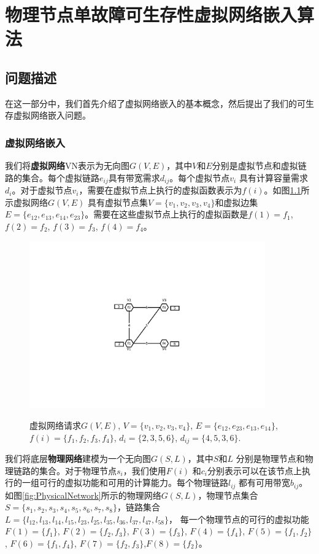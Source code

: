 \chapter{物理节点单故障可生存性虚拟网络嵌入算法}
\section{问题描述}
在这一部分中，我们首先介绍了虚拟网络嵌入的基本概念，然后提出了我们的可生存虚拟网络嵌入问题。
\subsection{虚拟网络嵌入}
我们将\textbf{虚拟网络}VN表示为无向图$G (V,E)$，其中$V$和$E$分别是虚拟节点和虚拟链路的集合。每个虚拟链路$e_{ij}$具有带宽需求$d_{ij}$。每个虚拟节点$v_i$ 具有计算容量需求$d_i$。对于虚拟节点$v_i$，需要在虚拟节点上执行的虚拟函数表示为$f(i)$。如图\ref{fig:VirtualNetworkRequest}所示虚拟网络$G (V,E)$ 具有虚拟节点集$V=\{v_1,v_2,v_3,v_4\}$和虚拟边集$E= \{e_{12},e_{13},e_{14},e_{23}\}$。需要在这些虚拟节点上执行的虚拟函数是$f(1)=f_1$, $f(2)=f_2$, $f(3)=f_3$, $f(4)=f_4$。

\begin{figure}
\centering
\includegraphics[width=4in]{figures/VirtualNetworkRequest}\\
\caption{虚拟网络请求$G(V,E)$, $V=\{v_1,v_2,v_3,v_4\}$, $E=\{e_{12},e_{23},e_{13},e_{14}\}$,  $f(i)=\{f_1,f_2,f_3,f_4\}$, $d_i=\{2,3,5,6\}$, $d_{ij}=\{4,5,3,6\}. $
}\label{fig:VirtualNetworkRequest}
\end{figure}

我们将底层\textbf{物理网络}建模为一个无向图$G (S,L)$，其中$S$和$L$ 分别是物理节点和物理链路的集合。对于物理节点$s_i$，我们使用$F(i)$ 和$c_i$分别表示可以在该节点上执行的一组可行的虚拟功能和可用的计算能力。每个物理链路$l_{ij}$ 都有可用带宽$b_{ij}$。如图\ref{fig:PhysicalNetwork}所示的物理网络$G (S,L)$，物理节点集合$S=\{s_1,s_2,s_3,s_4,s_5,s_6,s_7,s_8\}$，链路集合$L=\{l_{12},l_{13},l_{14},l_{15},l_{23},l_{25},l_{35},l_{36},l_{37},l_{47},l_{58}\}$，
每一个物理节点的可行的虚拟功能$F(1)=\{f_1\}$, $F(2)=\{f_2,f_3\}$, $F(3)=\{f_3\}$, $F(4)=\{f_4\}$, $F(5)=\{f_1,f_2\}$, $F(6)=\{f_1,f_4\}$, $F(7)=\{f_2,f_3\}$,$F(8)=\{f_2\}$。

